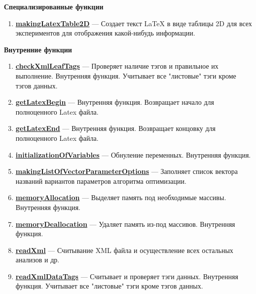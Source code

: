 \documentclass[a4paper,12pt]{article}
\begin{document}
\textbf{Специализированные функции}
\begin{enumerate}

\item \textbf{\hyperref[makingLatexTable2D]{makingLatexTable2D}} --- Создает текст LaTeX в виде таблицы 2D для всех экспериментов для отображения какой-нибудь информации.

\end{enumerate}

\textbf{Внутренние функции}
\begin{enumerate}

\item \textbf{\hyperref[checkXmlLeafTags]{checkXmlLeafTags}} --- Проверяет наличие тэгов и правильное их выполнение. Внутренняя функция. Учитывает все "листовые" тэги кроме тэгов данных.

\item \textbf{\hyperref[getLatexBegin]{getLatexBegin}} --- Внутренняя функция. Возвращает начало для полноценного Latex файла.

\item \textbf{\hyperref[getLatexEnd]{getLatexEnd}} --- Внутренняя функция. Возвращает концовку для полноценного Latex файла.

\item \textbf{\hyperref[initializationOfVariables]{initializationOfVariables}} --- Обнуление переменных. Внутренняя функция.

\item \textbf{\hyperref[makingListOfVectorParameterOptions]{makingListOfVectorParameterOptions}} --- Заполняет список вектора названий вариантов параметров алгоритма оптимизации.

\item \textbf{\hyperref[memoryAllocation]{memoryAllocation}} --- Выделяет память под необходимые массивы. Внутренняя функция.

\item \textbf{\hyperref[memoryDeallocation]{memoryDeallocation}} --- Удаляет память из-под массивов. Внутренняя функция.

\item \textbf{\hyperref[readXml]{readXml}} --- Считывание XML файла и осуществление всех остальных анализов и др.

\item \textbf{\hyperref[readXmlDataTags]{readXmlDataTags}} --- Считывает и проверяет тэги данных. Внутренняя функция. Учитывает все "листовые" тэги кроме тэгов данных.


\end{enumerate}
\end{document}

